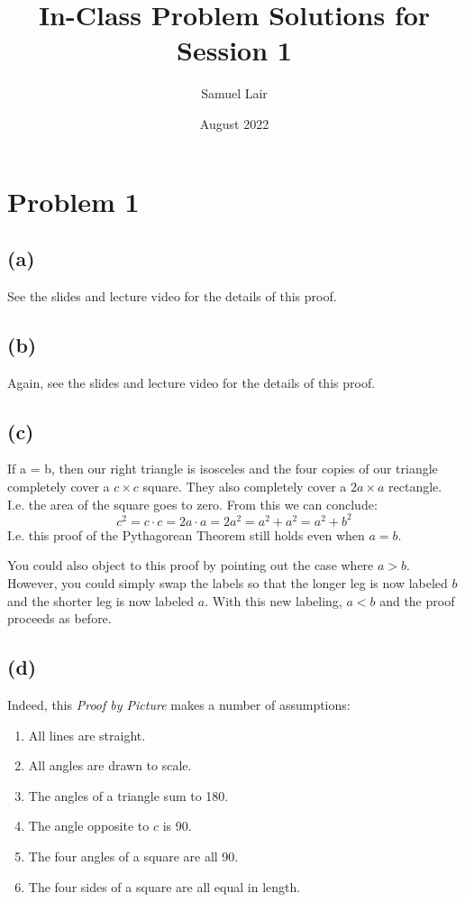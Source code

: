 \documentclass{article}
\title{In-Class Problem Solutions for Session 1}
\author{Samuel Lair}
\date{August 2022}
\begin{document}
\maketitle
\tableofcontents

\pagebreak

\section{Problem 1}
\subsection{(a)}
See the slides and lecture video for the details of this proof.
\subsection{(b)}
Again, see the slides and lecture video for the details of this proof.
\subsection{(c)}
If a = b, then our right triangle is isosceles and the four copies of our triangle completely cover a $c \times c$ square.  They also completely cover a $2a \times a$ rectangle.  I.e. the area of the square goes to zero. From this we can conclude:
\[c^2 = c \cdot c = 2a \cdot a = 2a^2 = a^2 + a^2 = a^2 + b^2\]
I.e. this proof of the Pythagorean Theorem still holds even when $a = b$.

You could also object to this proof by pointing out the case where $a > b$. However, you could simply swap the labels so that the longer leg is now labeled $b$ and the shorter leg is now labeled $a$. With this new labeling, $a < b$ and the proof proceeds as before.
\subsection{(d)}
Indeed, this \textit{Proof by Picture} makes a number of assumptions:
\begin{enumerate}
	\item All lines are straight.
	\item All angles are drawn to scale.
	\item The angles of a triangle sum to 180\degree.
	\item The angle opposite to $c$ is 90\degree.
	\item The four angles of a square are all 90\degree.
	\item The four sides of a square are all equal in length.
\end{enumerate}
\end{document}
